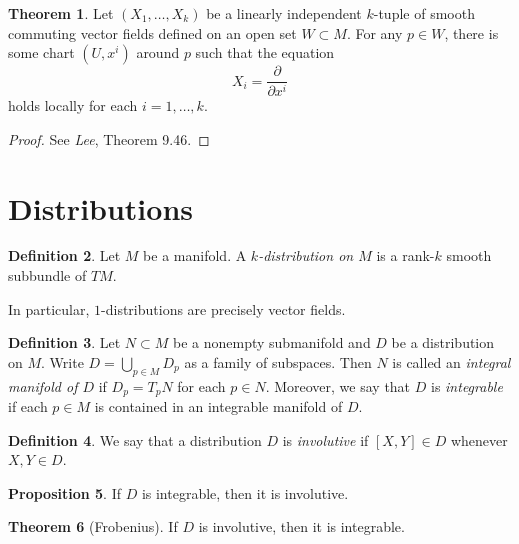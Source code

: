 \documentclass[10pt,letterpaper,cm]{nupset}
\theoremstyle{definition}
\newtheorem{definition}{Definition}[subsection]
\theoremstyle{theorem}
\newtheorem{theorem}[definition]{Theorem}
\newtheorem{prop}[definition]{Proposition}
\theoremstyle{remark}
\newcommand{\1}{\mathbf{1}}
\newcommand{\0}{\vec 0}
\begin{document}
\begin{theorem}
Let $(X_1, \ldots, X_k)$ be a linearly independent $k$-tuple of smooth commuting vector fields defined on an open set $W\subset M$. For any $p\in W$, there is some chart $(U, x^i)$ around $p$ such that the equation $$X_i = \frac{\partial}{\partial{x^i}}$$ holds locally for each $i=1, \ldots, k$.
\end{theorem}
\begin{proof}
See \textit{Lee}, Theorem 9.46.
\end{proof}

\section{Distributions}

\begin{definition}
Let $M$ be a manifold. A \textit{$k$-distribution on $M$} is a rank-$k$ smooth subbundle of $TM$.
\end{definition}

In particular, $1$-distributions are precisely vector fields. 


\begin{definition}
Let $N\subset M$ be a nonempty submanifold and $D$ be a distribution on $M$. Write $D = \bigcup_{p\in M}D_p$ as a family of subspaces. Then $N$ is called an \textit{integral manifold of $D$} if $D_p = T_pN$ for each $p\in N$. Moreover, we say that $D$ is \textit{integrable} if each $p\in M$ is contained in an integrable manifold of $D$.  
\end{definition}

\begin{definition}
We say that a distribution $D$ is \textit{involutive} if $[X,Y]\in D$ whenever $X,Y \in D$. 
\end{definition}

\begin{prop}
If $D$ is integrable, then it is involutive.
\end{prop}

\begin{theorem}[Frobenius]
If $D$ is involutive, then it is integrable. 
\end{theorem}
\end{document}
